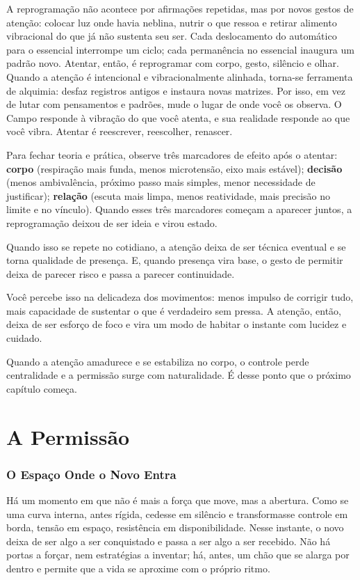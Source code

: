 \documentclass[12pt]{book}
\begin{document}
A reprogramação não acontece por afirmações repetidas, mas por novos gestos de atenção: colocar luz onde havia neblina, nutrir o que ressoa e retirar alimento vibracional do que já não sustenta seu ser. Cada deslocamento do automático para o essencial interrompe um ciclo; cada permanência no essencial inaugura um padrão novo. Atentar, então, é reprogramar com corpo, gesto, silêncio e olhar. Quando a atenção é intencional e vibracionalmente alinhada, torna-se ferramenta de alquimia: desfaz registros antigos e instaura novas matrizes. Por isso, em vez de lutar com pensamentos e padrões, mude o lugar de onde você os observa. O Campo responde à vibração do que você atenta, e sua realidade responde ao que você vibra. Atentar é reescrever, reescolher, renascer.

Para fechar teoria e prática, observe três marcadores de efeito após o atentar: \textbf{corpo} (respiração mais funda, menos microtensão, eixo mais estável); \textbf{decisão} (menos ambivalência, próximo passo mais simples, menor necessidade de justificar); \textbf{relação} (escuta mais limpa, menos reatividade, mais precisão no limite e no vínculo). Quando esses três marcadores começam a aparecer juntos, a reprogramação deixou de ser ideia e virou estado.

Quando isso se repete no cotidiano, a atenção deixa de ser técnica eventual e se torna qualidade de presença. E, quando presença vira base, o gesto de permitir deixa de parecer risco e passa a parecer continuidade.

Você percebe isso na delicadeza dos movimentos: menos impulso de corrigir tudo, mais capacidade de sustentar o que é verdadeiro sem pressa. A atenção, então, deixa de ser esforço de foco e vira um modo de habitar o instante com lucidez e cuidado.

Quando a atenção amadurece e se estabiliza no corpo, o controle perde centralidade e a permissão surge com naturalidade. É desse ponto que o próximo capítulo começa.

\chapter{A Permissão}

\subsection*{O Espaço Onde o Novo Entra}

Há um momento em que não é mais a força que move, mas a abertura. Como se uma curva interna, antes rígida, cedesse em silêncio e transformasse controle em borda, tensão em espaço, resistência em disponibilidade. Nesse instante, o novo deixa de ser algo a ser conquistado e passa a ser algo a ser recebido. Não há portas a forçar, nem estratégias a inventar; há, antes, um chão que se alarga por dentro e permite que a vida se aproxime com o próprio ritmo.
\end{document}
